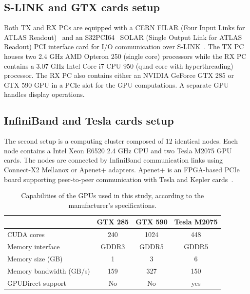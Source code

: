 \documentclass[journal]{IEEEtran}
\begin{document}
\subsection{S-LINK and GTX cards setup}

Both TX and RX PCs are equipped with a CERN FILAR (Four Input Links
for ATLAS Readout)~\cite{bib_filar} and an S32PCI64~\cite{bib_solar}
SOLAR (Single Output Link for ATLAS Readout) PCI interface card for
I/O communication over S-LINK~\cite{bib_slink}.  The TX PC houses two
2.4 GHz AMD Opteron 250 (single core) processors while the RX PC
contains a 3.07 GHz Intel Core i7 CPU 950 (quad core with
hyperthreading) processor.  The RX PC also contains either an NVIDIA GeForce GTX 285 or GTX 590 GPU in a PCIe slot for the GPU computations. A separate GPU handles display operations.


%

\subsection{InfiniBand and Tesla cards setup}
The second setup is a computing cluster composed of 12 identical nodes. 
Each node contains a Intel Xeon E6520 2.4 GHz CPU and two Tesla M2075 
GPU cards. The nodes are connected by InfiniBand communication 
links using Connect-X2 Mellanox or Apenet+ adapters. 
Apenet+ is an FPGA-based PCIe board supporting peer-to-peer communication with 
Tesla and Kepler cards~\cite{bib_Apenet}.


\begin{table}[!t]
  \centering
  \begin{tabular}{|l|c|c|c|}
    \hline
    & GTX 285 & GTX 590 & Tesla M2075 \\
    \hline
    \hline
    CUDA cores & 240 & 1024 & 448  \\
    Memory interface & GDDR3 & GDDR5 & GDDR5 \\
    Memory size (GB) & 1 & 3 & 6  \\
    Memory bandwidth  (GB/s) & 159 & 327 & 150 \\   
    GPUDirect support & No & No & yes \\
    \hline
  \end{tabular}
  \caption{Capabilities of the GPUs used in this study, according to the manufacturer's specifications.}
  \label{tab_GPUcards}
\end{table}
 
\end{document}
